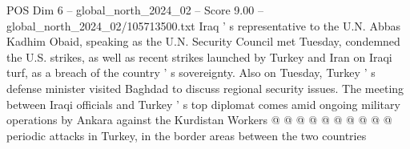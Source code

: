 \begin{textsample}{POS Dim 6 – global\_north\_2024\_02 – Score 9.00 – global\_north\_2024\_02/105713500.txt}
Iraq ' s representative to the U.N.
Abbas Kadhim Obaid, speaking as the U.N.
Security Council met Tuesday, condemned the U.S. strikes, as well as recent strikes launched by Turkey and Iran on Iraqi turf, as a breach of the country ' s sovereignty.
Also on Tuesday, Turkey ' s defense minister visited Baghdad to discuss regional security issues.
The meeting between Iraqi officials and Turkey ' s top diplomat comes amid ongoing military operations by Ankara against the Kurdistan Workers @ @ @ @ @ @ @ @ @ @ periodic attacks in Turkey, in the border areas between the two countries

\end{textsample}
